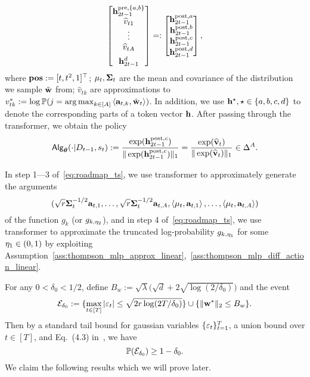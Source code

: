 \begin{align}
\begin{bmatrix}
    \bh_{2t-1}^{\pre,\{\parta,\partb\}}\\ \hat v_{t1}\\\vdots\\ \hat{v}_{tA} \vspace{0.5em}\\ \bh_{2t-1}^{\partd}
\end{bmatrix}
=:
\begin{bmatrix}
    \bh_{2t-1}^{\post,\parta} \\  \bh_{2t-1}^{\post,\partb}\\  \bh_{2t-1}^{\post,\partc}\\   \bh_{2t-1}^{\post,\partd}
\end{bmatrix},\notag
\end{align}
where ${\mathbf{pos}}:=[t,t^2,1]^\top$; ${{\mathbf\mu}}_t,{{\mathbf\Sigma}}_t$ are the mean and covariance of the distribution we sample $\tilde{{\mathbf w}}$ from; $\hat v_{tk}$ are approximations to $v^*_{tk}:=\log \mathbb{P}(j=\operatorname*{arg\,max}_{k\in[A]}\left\langle{\mathbf a}_{t,k},{\tilde{{\mathbf w}}}_t\right\rangle)$. In addition, we use ${\mathbf h}^\star,\star\in\{{a},{b},{c},{d}\}$ to denote the corresponding parts of a token vector ${\mathbf h}$. After passing through the transformer, we obtain the policy
$$
{\mathsf{Alg}}_{{\boldsymbol \theta}}(\cdot|{D}_{t-1},{s}_t):=\frac{\exp({\mathbf h}^{{\mathrm{post}},{c}}_{2t-1})}{\|\exp({\mathbf h}^{{\mathrm{post}},{c}}_{2t-1})\|_1}=\frac{\exp(\widehat {{\mathbf v}}_t)}{\|\exp(\widehat {{\mathbf v}}_t)\|_1}\in\Delta^A.
$$

In step 1---3 of~\eqref{eq:roadmap_ts},  we use transformer to approximately generate the arguments $$(\sqrt{{r}}{{\mathbf\Sigma}}_t^{-1/2}{\mathbf a}_{t,1},\ldots,\sqrt{{r}}{{\mathbf\Sigma}}_t^{-1/2}{\mathbf a}_{t,A},\left\langle{{\mathbf\mu}}_t,{\mathbf a}_{t,1}\right\rangle,\ldots,\left\langle{{\mathbf\mu}}_t,{\mathbf a}_{t,A}\right\rangle)$$ of the function $g_k$ (or $g_{k,{\eta_2}}$), and in step 4 of~\eqref{eq:roadmap_ts}, we use transformer to approximate the truncated log-probability $g_{k,{\eta_1}}$ for some ${\eta_1}\in(0,1)$ by exploiting Assumption~\ref{ass:thompson_mlp_approx_linear},~\ref{ass:thompson_mlp_diff_action_linear}.

For any $0<\delta_0<1/2$, define $B_w:=\sqrt{\lambda}\big(\sqrt{d}+2\sqrt{\log(2/\delta_0)}\big)$ and the event $${\mathcal E}_{\delta_0}:=\{\max_{t\in[T]}|\varepsilon_t|\leq\sqrt{2{r}\log(2T/\delta_0)}\}\cup \{\|{\mathbf w}^*\|_2\leq  B_w\}.$$ Then by  a standard tail bound for gaussian variables $\{\varepsilon_t\}_{t=1}^{T}$,  a union bound over $t\in[T]$, and Eq.~(4.3) in~\cite{laurent2000adaptive}, we have $$\mathbb{P}({\mathcal E}_{\delta_0})\geq 1-{\delta_0}.$$
We claim the following results which we will prove later.


